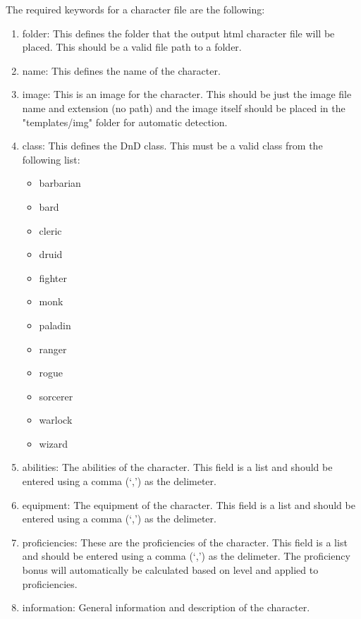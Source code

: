 The required keywords for a character file are the following:
\begin{enumerate}
	\item folder: This defines the folder that the output html character file will be placed. This should be a valid file path to a folder.
	\item name: This defines the name of the character.
	\item image: This is an image for the character. This should be just the image file name and extension (no path) and the image itself should be placed in the "templates/img" folder for automatic detection.
	\item class: This defines the DnD class. This must be a valid class from the following list:
		\begin{multicols}{3}
		    \begin{itemize}
		        \item barbarian
		        \item bard
		        \item cleric
		        \item druid
		        \item fighter
		        \item monk
		        \item paladin
		        \item ranger
		        \item rogue
		        \item sorcerer
		        \item warlock
		        \item wizard
		    \end{itemize}
		\end{multicols}
	\item abilities: The abilities of the character. This field is a list and should be entered using a comma (`,') as the delimeter.
	\item equipment: The equipment of the character. This field is a list and should be entered using a comma (`,') as the delimeter.
	\item proficiencies: These are the proficiencies of the character. This field is a list and should be entered using a comma (`,') as the delimeter. The proficiency bonus will automatically be calculated based on level and applied to proficiencies.
	\item information: General information and description of the character.
\end{enumerate}

